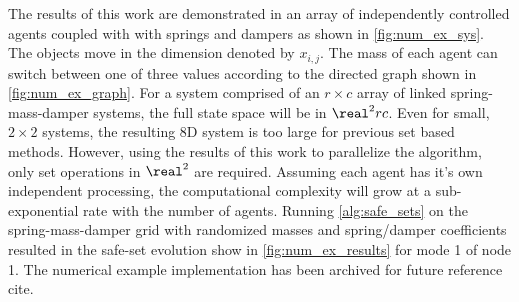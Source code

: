 The results of this work are demonstrated in an array of independently controlled agents coupled with with springs and dampers as shown in \autoref{fig:num_ex_sys}. The objects move in the dimension denoted by $x_{i,j}$. The mass of each agent can switch between one of three values according to the directed graph shown in \autoref{fig:num_ex_graph}. For a system comprised of an $r\times c$ array of linked spring-mass-damper systems, the full state space will be in $\real^2rc$. Even for small, $2\times 2$ systems, the resulting 8D system is too large for previous set based methods. However, using the results of this work to parallelize the algorithm, only set operations in $\real^2$ are required. Assuming each agent has it's own independent processing, the computational complexity will grow at a sub-exponential rate with the number of agents. Running \autoref{alg:safe_sets} on the spring-mass-damper grid with randomized masses and spring/damper coefficients resulted in the safe-set evolution show in \autoref{fig:num_ex_results} for mode 1 of node 1. The numerical example implementation has been archived for future reference \alert{cite}. 